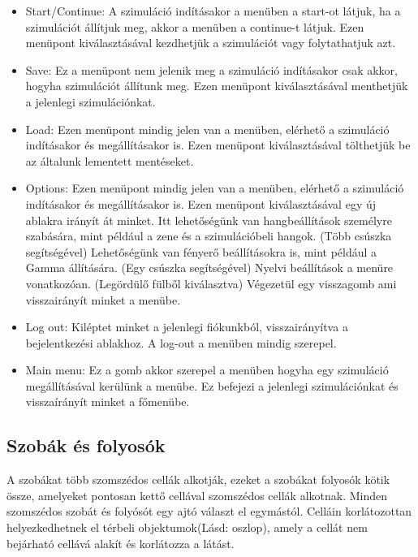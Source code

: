 \begin{itemize}
    \item Start/Continue:
    A szimuláció indításakor a menüben a start-ot látjuk, ha a szimulációt állítjuk meg, akkor a menüben a continue-t látjuk.
    Ezen menüpont kiválasztásával kezdhetjük a szimulációt vagy folytathatjuk azt.
    \item Save:
    Ez a menüpont nem jelenik meg a szimuláció indításakor csak akkor, hogyha szimulációt állítunk meg.
    Ezen menüpont kiválasztásával menthetjük a jelenlegi szimulációnkat.
    \item Load:
    Ezen menüpont mindig jelen van a menüben, elérhető a szimuláció indításakor és megállításakor is.
    Ezen menüpont kiválasztásával tölthetjük be az általunk lementett mentéseket.
    \item Options:
    Ezen menüpont mindig jelen van a menüben, elérhető a szimuláció indításakor és megállításakor is.
    Ezen menüpont kiválasztásával egy új ablakra irányít át minket.
    Itt lehetőségünk van hangbeállítások személyre szabására, mint például a zene és a szimulációbeli hangok. (Több csúszka segítségével)
    Lehetőségünk van fényerő beállításokra is, mint például a Gamma állítására. (Egy csúszka segítségével)
    Nyelvi beállítások a menüre vonatkozóan. (Legördülő fülből kiválasztva)
    Végezetül egy visszagomb ami visszairányít minket a menübe.
    \item Log out:
    Kiléptet minket a jelenlegi fiókunkból, visszairányítva a bejelentkezési ablakhoz.
    A log-out a menüben mindig szerepel.
    \item Main menu:
    Ez a gomb akkor szerepel a menüben hogyha egy szimuláció megállításával kerülünk a menübe.
    Ez befejezi a jelenlegi szimulációnkat és visszaírányít minket a főmenübe.
\end{itemize}


\subsection{Szobák és folyosók}

A szobákat több szomszédos cellák alkotják, ezeket a szobákat folyosók kötik össze, amelyeket pontosan kettő cellával szomszédos cellák alkotnak.
Minden szomszédos szobát és folyósót egy ajtó választ el egymástól.
Celláin korlátozottan helyezkedhetnek el térbeli objektumok(Lásd: oszlop), amely a cellát nem bejárható cellává alakít és korlátozza a látást.

